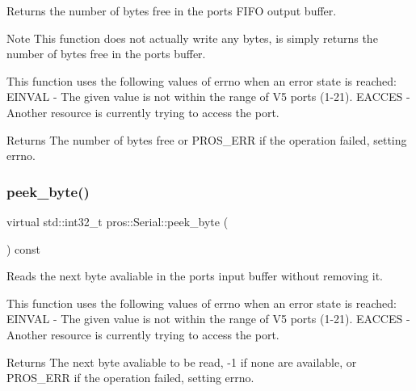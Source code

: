 Returns the number of bytes free in the port\textquotesingle{}s F\+I\+FO output buffer. 

\begin{DoxyNote}{Note}
This function does not actually write any bytes, is simply returns the number of bytes free in the port\textquotesingle{}s buffer.
\end{DoxyNote}
This function uses the following values of errno when an error state is reached\+: E\+I\+N\+V\+AL -\/ The given value is not within the range of V5 ports (1-\/21). E\+A\+C\+C\+ES -\/ Another resource is currently trying to access the port.

\begin{DoxyReturn}{Returns}
The number of bytes free or P\+R\+O\+S\+\_\+\+E\+RR if the operation failed, setting errno. 
\end{DoxyReturn}
\mbox{\label{classpros_1_1Serial_a5ec51db5a7726f2220723971c1999881}} 
\subsubsection{\texorpdfstring{peek\+\_\+byte()}{peek\_byte()}}
{\footnotesize\ttfamily virtual std\+::int32\+\_\+t pros\+::\+Serial\+::peek\+\_\+byte (\begin{DoxyParamCaption}{ }\end{DoxyParamCaption}) const\hspace{0.3cm}{\ttfamily [virtual]}}



Reads the next byte avaliable in the port\textquotesingle{}s input buffer without removing it. 

This function uses the following values of errno when an error state is reached\+: E\+I\+N\+V\+AL -\/ The given value is not within the range of V5 ports (1-\/21). E\+A\+C\+C\+ES -\/ Another resource is currently trying to access the port.

\begin{DoxyReturn}{Returns}
The next byte avaliable to be read, -\/1 if none are available, or P\+R\+O\+S\+\_\+\+E\+RR if the operation failed, setting errno. 
\end{DoxyReturn}
\mbox{\label{classpros_1_1Serial_a0d42f31fa7a5bd936010a346167c1946}} 
